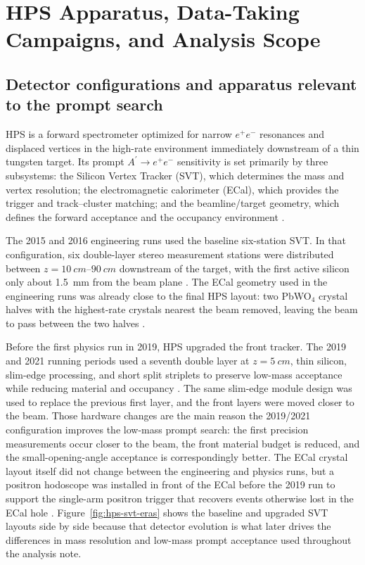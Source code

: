\section{HPS Apparatus, Data-Taking Campaigns, and Analysis Scope}
\label{sec:datasets}

\subsection{Detector configurations and apparatus relevant to the prompt search}

HPS is a forward spectrometer optimized for narrow $e^+e^-$ resonances and displaced
vertices in the high-rate environment immediately downstream of a thin tungsten target.
Its prompt $A^\prime \rightarrow e^+e^-$ sensitivity is set primarily by three
subsystems: the Silicon Vertex Tracker (SVT), which determines the mass and vertex
resolution; the electromagnetic calorimeter (ECal), which provides the trigger and
track--cluster matching; and the beamline/target geometry, which defines the forward
acceptance and the occupancy environment \cite{HPSExperiment2022,HPS2016PromptLong}.

The 2015 and 2016 engineering runs used the baseline six-station SVT. In that
configuration, six double-layer stereo measurement stations were distributed between
$z=\SIrange{10}{90}{cm}$ downstream of the target, with the first active silicon only
about \SI{1.5}{mm} from the beam plane \cite{HPS2016BumpInternal,HPSExperiment2022}.
The ECal geometry used in the engineering runs was already close to the final HPS
layout: two PbWO$_4$ crystal halves with the highest-rate crystals nearest the beam
removed, leaving the beam to pass between the two halves
\cite{HPS2016BumpInternal,HPSExperiment2022}.

Before the first physics run in 2019, HPS upgraded the front tracker. The 2019 and
2021 running periods used a seventh double layer at $z=\SI{5}{cm}$, thin silicon,
slim-edge processing, and short split striplets to preserve low-mass acceptance while
reducing material and occupancy \cite{HPSExperiment2022,HPSSlimEdgeSensors2020}. The
same slim-edge module design was used to replace the previous first layer, and the
front layers were moved closer to the beam. Those hardware changes are the main reason
the 2019/2021 configuration improves the low-mass prompt search: the first precision
measurements occur closer to the beam, the front material budget is reduced, and the
small-opening-angle acceptance is correspondingly better. The ECal crystal layout
itself did not change between the engineering and physics runs, but a positron
hodoscope was installed in front of the ECal before the 2019 run to support the
single-arm positron trigger that recovers events otherwise lost in the ECal hole
\cite{HPSExperiment2022}. Figure~\ref{fig:hps-svt-eras} shows the baseline and
upgraded SVT layouts side by side because that detector evolution is what later drives
the differences in mass resolution and low-mass prompt acceptance used throughout the
analysis note.


